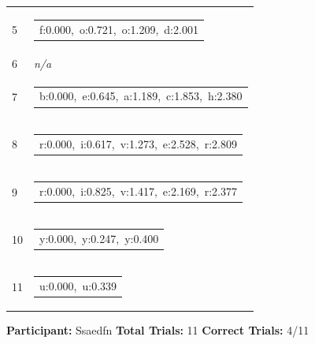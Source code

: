 \documentclass[10pt,a4paper]{article}
\begin{document}
\begin{center}
\begin{tabularx}{\textwidth}{
    C{0.55in}
    X
}
5 &
\begin{tabular}[t]{@{}l@{}}
f:0.000,\ o:0.721,\ o:1.209,\ d:2.001
\end{tabular}
\\[0.12cm]

6 &
\textit{n/a}
\\[0.12cm]

7 &
\begin{tabular}[t]{@{}l@{}}
b:0.000,\ e:0.645,\ a:1.189,\ c:1.853,\ h:2.380
\end{tabular}
\\[0.12cm]

8 &
\begin{tabular}[t]{@{}l@{}}
r:0.000,\ i:0.617,\ v:1.273,\ e:2.528,\ r:2.809
\end{tabular}
\\[0.12cm]

9 &
\begin{tabular}[t]{@{}l@{}}
r:0.000,\ i:0.825,\ v:1.417,\ e:2.169,\ r:2.377
\end{tabular}
\\[0.12cm]

10 &
\begin{tabular}[t]{@{}l@{}}
y:0.000,\ y:0.247,\ y:0.400
\end{tabular}
\\[0.12cm]

11 &
\begin{tabular}[t]{@{}l@{}}
u:0.000,\ u:0.339
\end{tabular}
\\[0.12cm]

\bottomrule
\end{tabularx}
\end{center}

\vfill


\noindent
\textbf{Participant:} Ssaedfn
\hfill
\textbf{Total Trials:} 11
\hfill
\textbf{Correct Trials:} 4/11
\end{document}
